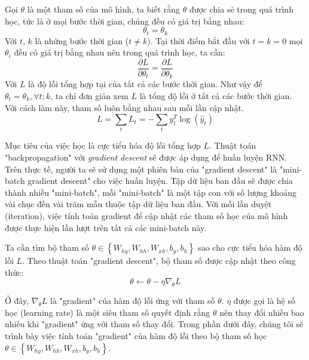 Gọi $\theta$ là một tham số của mô hình, ta biết rằng $\theta$ được chia sẻ trong quá trình học, tức là ở mọi bước thời gian, chúng đều có giá trị bằng nhau:
\begin{equation} \label{weightSharing1}
	\theta_t = \theta_k
\end{equation}
Với $t$, $k$ là những bước thời gian ($t \ne k$). Tại thời điểm bắt đầu với $t=k=0$ mọi $\theta_i$ đều có giá trị bằng nhau nên trong quá trình học, ta cần:
\begin{equation} \label{weightSharing2}
	\frac{\partial L}{\partial \theta_t} = \frac{\partial L}{\partial \theta_k}
\end{equation}
Với $L$ là độ lỗi tổng hợp tại của tất cả các bước thời gian. Như vậy để $\theta_t = \theta_k, \forall t;k$, ta chỉ đơn giản xem $L$ là tổng độ lỗi ở tất cả các bước thời gian. Với cách làm này, tham số luôn bằng nhau sau mỗi lần cập nhật.
\begin{equation} \label{errorOfAll}
	L = \sum_{t}L_t = - \sum_{t} y_t^{T} \log(\hat{y}_t) 
\end{equation}

Mục tiêu của việc học là cực tiểu hóa độ lỗi tổng hợp $L$. Thuật toán "backpropagation" với \textit{gradient descent} sẽ được áp dụng để huấn luyện RNN. Trên thực tế, người ta sẽ sử dụng một phiên bản của "gradient descent" là "mini-batch gradient descent" cho việc huấn luyện. Tập dữ liệu ban đầu sẽ được chia thành nhiều "mini-batch", mỗi "mini-batch" là một tập con với số lượng khoảng vài chục đến vài trăm mẫu thuộc tập dữ liệu ban đầu. Với mỗi lần duyệt (iteration), việc tính toán gradient để cập nhật các tham số học của mô hình được thực hiện lần lượt trên tất cả các mini-batch này.

Ta cần tìm bộ tham số $\theta \in \left\{W_{hy},W_{hh},W_{xh},b_y,b_h \right \}$ sao cho cực tiểu hóa hàm độ lỗi $L$. Theo thuật toán "gradient descent", bộ tham số được cập nhật theo công thức:
\begin{equation} \label{gradientDescentWithTheta}
	\theta \leftarrow \theta - \eta \nabla_{\theta} L
\end{equation}

Ở đây, $\nabla_{\theta} L$ là "gradient" của hàm độ lỗi ứng với tham số $\theta$. $\eta$ được gọi là hệ số học (learning rate) là một siêu tham số quyết định rằng $\theta$ nên thay đổi nhiều bao nhiêu khi "gradient" ứng với tham số thay đổi. Trong phần dưới đây, chúng tôi sẽ trình bày việc tính toán "gradient" của hàm độ lỗi theo bộ tham số học $\theta \in \left\{W_{hy},W_{hh},W_{xh},b_y,b_h \right \}$.

